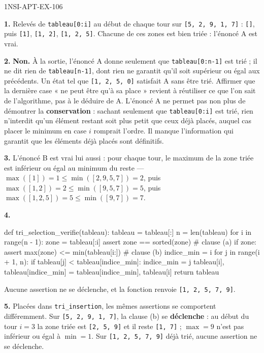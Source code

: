 \begin{corrige}{1NSI-APT-EX-106}

\textbf{1.} Relevés de \lstinline{tableau[0:i]} au début de chaque tour sur
\lstinline{[5, 2, 9, 1, 7]} : \lstinline{[]}, puis \lstinline{[1]}, \lstinline{[1, 2]},
\lstinline{[1, 2, 5]}. Chacune de ces zones est bien triée : l'énoncé A est vrai.

\textbf{2.} \textbf{Non.} À la sortie, l'énoncé A donne seulement que
\lstinline{tableau[0:n-1]} est trié ; il ne dit rien de \lstinline{tableau[n-1]}, dont
rien ne garantit qu'il soit supérieur ou égal aux précédents. Un état tel que
\lstinline{[1, 2, 5, 0]} satisfait A sans être trié. Affirmer que la dernière case « ne
peut être qu'à sa place » revient à réutiliser ce que l'on sait de l'algorithme, pas à le
déduire de A. L'énoncé A ne permet pas non plus de démontrer la \textbf{conservation} :
sachant seulement
que \lstinline{tableau[0:i]} est trié, rien n'interdit qu'un élément restant soit plus petit
que ceux déjà placés, auquel cas placer le minimum en case $i$ romprait l'ordre. Il manque
l'information qui garantit que les éléments déjà placés sont définitifs.

\textbf{3.} L'énoncé B est vrai lui aussi : pour chaque tour, le maximum de la zone triée
est inférieur ou égal au minimum du reste — $\max([1]) = 1 \leqslant \min([2, 9, 5, 7]) = 2$,
puis $\max([1, 2]) = 2 \leqslant \min([9, 5, 7]) = 5$, puis
$\max([1, 2, 5]) = 5 \leqslant \min([9, 7]) = 7$.

\textbf{4.}
\begin{python}
def tri_selection_verifie(tableau):
    tableau = tableau[:]
    n = len(tableau)
    for i in range(n - 1):
        zone = tableau[:i]
        assert zone == sorted(zone)              # clause (a)
        if zone:
            assert max(zone) <= min(tableau[i:]) # clause (b)
        indice_min = i
        for j in range(i + 1, n):
            if tableau[j] < tableau[indice_min]:
                indice_min = j
        tableau[i], tableau[indice_min] = tableau[indice_min], tableau[i]
    return tableau
\end{python}
Aucune assertion ne se déclenche, et la fonction renvoie \lstinline{[1, 2, 5, 7, 9]}.

\textbf{5.} Placées dans \lstinline{tri_insertion}, les mêmes assertions se comportent
différemment. Sur \lstinline{[5, 2, 9, 1, 7]}, la clause (b) se \textbf{déclenche} : au
début du tour $i=3$ la zone triée est \lstinline{[2, 5, 9]} et il reste \lstinline{[1, 7]} ;
$\max = 9$ n'est pas inférieur ou égal à $\min = 1$. Sur \lstinline{[1, 2, 5, 7, 9]} déjà
trié, aucune assertion ne se déclenche.


\end{corrige}
